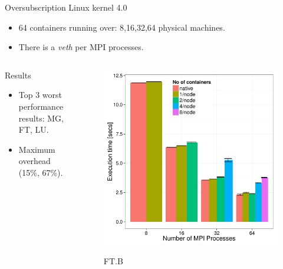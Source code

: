 \documentclass[presentation]{beamer}
\begin{document}
\begin{frame}[label=sec-3-4]{Oversubscription Linux kernel 4.0}
\begin{itemize}
\item 64 containers running over: 8,16,32,64 physical machines.
\item There is a \textit{veth} per MPI processes.
\end{itemize}
\begin{columns}
\begin{column}{0.5\textwidth}
\begin{block}{Results}

\begin{itemize}
\item Top 3 worst performance results: MG, FT, LU.
\item Maximum overhead (15\%, 67\%).
\end{itemize}
\end{block}
\end{column}

\begin{column}{0.5\textwidth}


\begin{figure}[!h]
  \center
  \includegraphics[scale=0.30]{figures/execution_time-tso-40.pdf}
  \label{fig:hpc}
  \caption{FT.B}
\end{figure}
\end{column}
\end{columns}
\end{frame}
\end{document}
